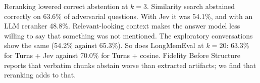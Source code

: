 \documentclass[11pt]{article}
\newcommand{\src}[1]{}
\begin{document}
Reranking lowered correct abstention at $k{=}$3. Similarity search abstained correctly on 63.6\%\src{bench/results/v3/batch\_a\_report.json\#fresh\_adversarial/L0 k3/abstained} of adversarial questions. With Jev it was 54.1\%\src{bench/results/v3/batch\_a\_report.json\#fresh\_adversarial/T0R k3/abstained}, and with an LLM reranker 48.8\%\src{bench/results/v3/batch\_b\_report.json\#fresh\_adversarial/T0R-LLM k3/abstained}. Relevant-looking context makes the answer model less willing to say that something was not mentioned. The exploratory conversations show the same (54.2\%\src{bench/results/v3/batch\_a\_report.json\#exploratory/adversarial/T0R k3/abstained} against 65.3\%\src{bench/results/v3/batch\_a\_report.json\#exploratory/adversarial/L0 k3/abstained}). So does LongMemEval at $k{=}$20: 63.3\%\src{bench/results/v3/batch\_c\_report.json\#expansion/T0R 20 (abstention, correct = abstained)/accuracy} for Turns + Jev against 70.0\%\src{bench/results/v3/batch\_c\_report.json\#expansion/L0 20 (abstention, correct = abstained)/accuracy} for Turns + cosine. Fidelity Before Structure reports that verbatim chunks abstain worse than extracted artifacts; we find that reranking adds to that.
\end{document}
